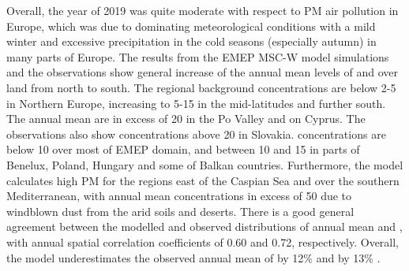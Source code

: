 Overall, the year of 2019 was quite moderate with respect to PM air pollution in Europe, which was due to dominating meteorological conditions with a mild winter and excessive precipitation in the cold seasons (especially autumn) in many parts of Europe. %
The results from the EMEP MSC-W model simulations and the observations show general increase of the annual mean levels of \PM[10] and \PM[2.5] over land from north to south. The regional background concentrations are below 2-5 \ug in Northern Europe, increasing to 5-15 \ug in the mid-latitudes and further south. The annual mean \PM[10] are in excess of 20 \ug in the Po Valley and on Cyprus. The observations also show \PM[10] concentrations above 20 \ug in Slovakia. \PM[2.5] concentrations are below 10 \ug over most of EMEP domain, and between 10 and 15 \ug in parts of Benelux, Poland, Hungary and some of Balkan countries. Furthermore, the model calculates high PM for the regions east of the Caspian Sea and over the southern Mediterranean, with annual mean concentrations in excess of 50 \ug due to windblown dust from the arid soils and deserts. There is a good general agreement between the modelled and observed distributions of annual mean \PM[10] and \PM[2.5], with annual spatial correlation coefficients of 0.60 and 0.72, respectively. Overall, the model underestimates the observed annual mean of \PM[10] by 12\% and \PM[2.5] by 13\% .

